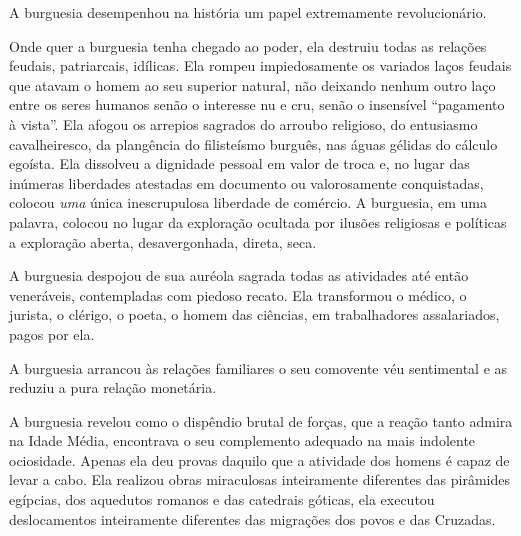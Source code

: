 A burguesia desempenhou na história um papel extremamente
revolucionário.

Onde quer a burguesia tenha chegado ao poder, ela destruiu todas as          \label{3}
relações feudais, patriarcais, idílicas. Ela rompeu impiedosamente os
variados laços feudais que atavam o homem ao seu superior natural, não
deixando nenhum outro laço entre os seres humanos senão o interesse nu
e cru, senão o insensível ``pagamento à vista''. Ela afogou os arrepios
sagrados do arroubo religioso, do entusiasmo cavalheiresco, da
plangência do filisteísmo burguês, nas águas gélidas do cálculo
egoísta. Ela dissolveu a dignidade pessoal em valor de troca e, no lugar
das inúmeras liberdades atestadas em documento ou valorosamente
conquistadas, colocou \textit{uma} única inescrupulosa liberdade de
comércio. A burguesia, em uma palavra, colocou no lugar da exploração
ocultada por ilusões religiosas e políticas a exploração aberta,
desavergonhada, direta, seca.

A burguesia despojou de sua auréola sagrada todas as atividades até
então veneráveis, contempladas com piedoso recato. Ela transformou o
médico, o jurista, o clérigo, o poeta, o homem das ciências, em
trabalhadores assalariados, pagos por ela.

A burguesia arrancou às relações familiares o seu comovente véu
sentimental e as reduziu a pura relação monetária.                         

A burguesia revelou como o dispêndio brutal de forças, que a reação
tanto admira na Idade Média, encontrava o seu complemento adequado na
mais indolente ociosidade. Apenas ela deu provas daquilo que a
atividade dos homens é capaz de levar a cabo. Ela realizou obras
miraculosas inteiramente diferentes das pirâmides egípcias, dos
aquedutos romanos e das catedrais góticas, ela executou deslocamentos
inteiramente diferentes das migrações dos povos e das Cruzadas.

